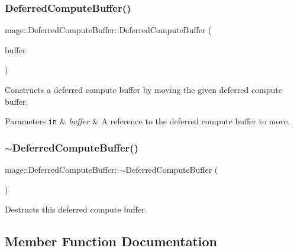\subsubsection{\texorpdfstring{Deferred\+Compute\+Buffer()}{DeferredComputeBuffer()}\hspace{0.1cm}{\footnotesize\ttfamily [3/3]}}
{\footnotesize\ttfamily mage\+::\+Deferred\+Compute\+Buffer\+::\+Deferred\+Compute\+Buffer (\begin{DoxyParamCaption}\item[{\hyperlink{structmage_1_1_deferred_compute_buffer}{Deferred\+Compute\+Buffer} \&\&}]{buffer }\end{DoxyParamCaption})\hspace{0.3cm}{\ttfamily [default]}}

Constructs a deferred compute buffer by moving the given deferred compute buffer.


\begin{DoxyParams}[1]{Parameters}
\mbox{\tt in}  & {\em buffer} & A reference to the deferred compute buffer to move. \\
\hline
\end{DoxyParams}
\hypertarget{structmage_1_1_deferred_compute_buffer_a7a554e0b06c201549bb9a1dc834d3b95}{}\label{structmage_1_1_deferred_compute_buffer_a7a554e0b06c201549bb9a1dc834d3b95} 
\subsubsection{\texorpdfstring{$\sim$\+Deferred\+Compute\+Buffer()}{~DeferredComputeBuffer()}}
{\footnotesize\ttfamily mage\+::\+Deferred\+Compute\+Buffer\+::$\sim$\+Deferred\+Compute\+Buffer (\begin{DoxyParamCaption}{ }\end{DoxyParamCaption})\hspace{0.3cm}{\ttfamily [default]}}

Destructs this deferred compute buffer. 

\subsection{Member Function Documentation}
\hypertarget{structmage_1_1_deferred_compute_buffer_a5ba8f51e5e5ee0561817cdcdc782009e}{}\label{structmage_1_1_deferred_compute_buffer_a5ba8f51e5e5ee0561817cdcdc782009e} 
